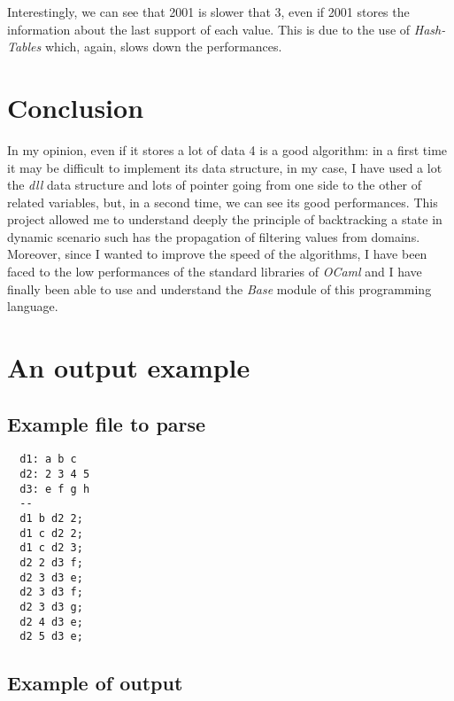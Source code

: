 \documentclass{rapport}
\begin{document}
Interestingly, we can see that \ac{2001} is slower that \ac{3}, even if \ac{2001} stores the information about the last support of each value. This is due to the use of \textit{Hash-Tables} which, again, slows down the performances.

\section{Conclusion}

In my opinion, even if it stores a lot of data \ac{4} is a good algorithm: in a first time it may be difficult to implement its data structure, in my case, I have used a lot the \textit{dll} data structure and lots of pointer going from one side to the other of related variables, but, in a second time, we can see its good performances. This project allowed me to understand deeply the principle of backtracking a state in dynamic scenario such has the propagation of filtering values from domains. Moreover, since I wanted to improve the speed of the algorithms, I have been faced to the low performances of the standard libraries of \textit{OCaml} and I have finally been able to use and understand the \textit{Base} module of this programming language.

\newpage

\appendix

\section{An output example}

\subsection{Example file to parse}
\label{sec:input_ex}
\begin{verbatim}
  d1: a b c 
  d2: 2 3 4 5
  d3: e f g h
  --
  d1 b d2 2;
  d1 c d2 2;
  d1 c d2 3;
  d2 2 d3 f;
  d2 3 d3 e;
  d2 3 d3 f;
  d2 3 d3 g;
  d2 4 d3 e;
  d2 5 d3 e;
\end{verbatim}


\subsection{Example of output}
\label{sec:output_ex}
\end{document}
